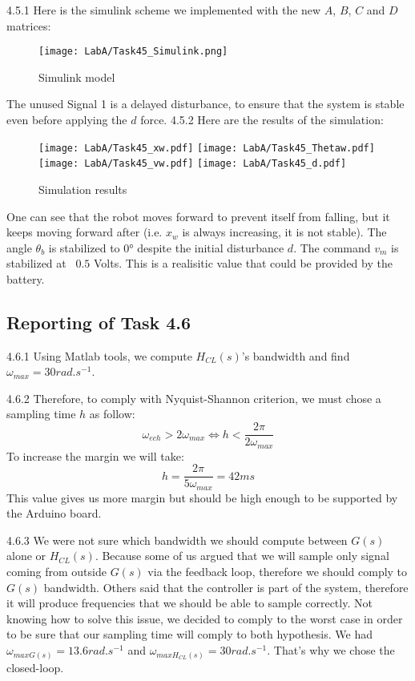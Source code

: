 \documentclass[11pt]{article}
\begin{document}
4.5.1 Here is the simulink scheme we implemented with the new $A$, $B$, $C$ and $D$ matrices:
\begin{figure}[H]
  \texttt{[image: LabA/Task45\_Simulink.png]}
  \caption{Simulink model}
  \label{fig:fig3}
\end{figure}
The unused Signal 1 is a delayed disturbance, to ensure that the system is stable even before applying the $d$ force.
\newpage
4.5.2 Here are the results of the simulation:
\begin{figure}[H]
  \texttt{[image: LabA/Task45\_xw.pdf]}
  \texttt{[image: LabA/Task45\_Thetaw.pdf]}
  \texttt{[image: LabA/Task45\_vw.pdf]}
  \texttt{[image: LabA/Task45\_d.pdf]}
  \caption{Simulation results}
  \label{fig:fig4}
\end{figure}
One can see that the robot moves forward to prevent itself from falling, but it keeps moving forward after (i.e. $x_w$ is always increasing, it is not stable). The angle $\theta_b$ is stabilized to $0$° despite the initial disturbance $d$. The command $v_m$ is stabilized at ~$0.5$ Volts. This is a realisitic value that could be provided by the battery.


\subsection*{Reporting of Task 4.6}
4.6.1 Using Matlab tools, we compute $H_{CL}(s)$'s bandwidth and find $\omega_{max}=30 rad.s^{-1}$.

4.6.2 Therefore, to comply with Nyquist-Shannon criterion, we must chose a sampling time $h$ as follow:
\begin{equation*}
\omega_{ech}>2\omega_{max}
\Leftrightarrow
h<\frac{2\pi}{2\omega_{max}}
\end{equation*}
To increase the margin we will take:
\begin{equation*}
h=\frac{2\pi}{5\omega_{max}}=42 ms
\end{equation*}
This value gives us more margin but should be high enough to be supported by the Arduino board.

4.6.3 We were not sure which bandwidth we should compute between $G(s)$ alone or $H_{CL}(s)$. Because some of us argued that we will sample only signal coming from outside $G(s)$ via the feedback loop, therefore we should comply to $G(s)$ bandwidth. Others said that the controller is part of the system, therefore it will produce frequencies that we should be able to sample correctly. Not knowing how to solve this issue, we decided to comply to the worst case in order to be sure that our sampling time will comply to both hypothesis. We had $\omega_{maxG(s)}=13.6 rad.s^{-1}$ and $\omega_{maxH_{CL}(s)}=30 rad.s^{-1}$. That's why we chose the closed-loop.
\end{document}
